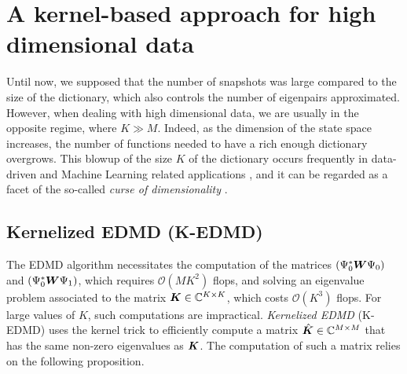 \section{A kernel-based approach for high dimensional data}
Until now, we supposed that the number of snapshots was large compared to the size of the dictionary, which also controls the number of eigenpairs approximated. However, when dealing with high dimensional data, we are usually in the opposite regime, where $K \gg M$. Indeed, as the dimension of the state space increases, the number of functions needed to have a rich enough dictionary overgrows. This blowup of the size $K$ of the dictionary occurs frequently in data-driven and Machine Learning related applications \cite{budisic_applied_2012, rowley_spectral_2009, schmid_dynamic_2010}, and it can be regarded as a facet of the so-called \emph{curse of dimensionality} \cite{bishop_pattern_2006}. 

\subsection{Kernelized EDMD (K-EDMD)}
The EDMD algorithm necessitates the computation of the matrices $(\Psi_0^*\vb*{W}\Psi_0)$ and $(\Psi_0^*\vb*{W}\Psi_1)$, which requires $\mathcal{O}(MK^2)$ flops, and solving an eigenvalue problem associated to the matrix $\vb*{K}\in\mathbb{C}^{K\times K}$, which costs $\mathcal{O}(K^3)$ flops. For large values of $K$, such computations are impractical. \emph{Kernelized EDMD} (K-EDMD) \cite{williams_kernel-based_2015} uses the kernel trick \cite{bishop_pattern_2006} to efficiently compute a matrix $\hat{\vb*{K}}\in\mathbb{C}^{M\times M}$ that has the same non-zero eigenvalues as $\vb*{K}$. The computation of such a matrix relies on the following proposition.

